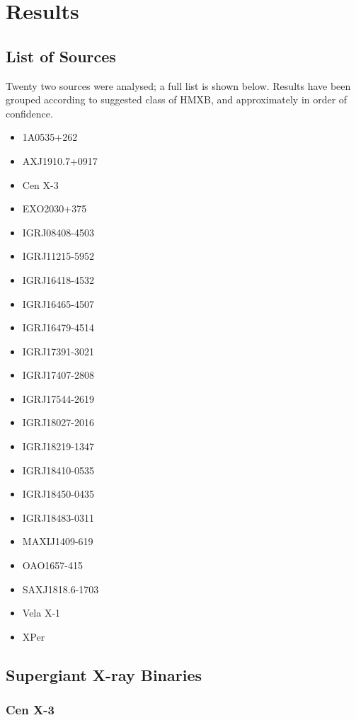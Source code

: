 
\chapter{Results} %

\label{ch:results} %

\section{List of Sources}
Twenty two sources were analysed; a full list is shown below. Results have been grouped according to suggested class of HMXB, and approximately in order of confidence.
\begin{itemize}
\item 1A0535+262
\item AXJ1910.7+0917
\item Cen X-3
\item EXO2030+375
\item IGRJ08408-4503
\item IGRJ11215-5952
\item IGRJ16418-4532
\item IGRJ16465-4507
\item IGRJ16479-4514
\item IGRJ17391-3021
\item IGRJ17407-2808
\item IGRJ17544-2619
\item IGRJ18027-2016
\item IGRJ18219-1347
\item IGRJ18410-0535
\item IGRJ18450-0435
\item IGRJ18483-0311
\item MAXIJ1409-619
\item OAO1657-415
\item SAXJ1818.6-1703
\item Vela X-1
\item XPer
\end{itemize}
\clearpage{}

\section{Supergiant X-ray Binaries}
\subsection{Cen X-3}

